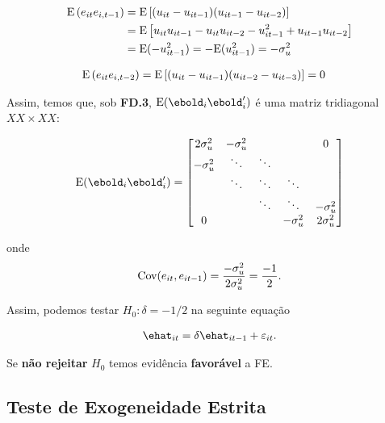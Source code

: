 \documentclass[11pt, oneside, a4paper, article]{article}
\numberwithin{equation}{section}
\begin{document}
\begin{description}
\vspace{-1.5 em}
\begin{align*}
\text{E}\left( e_{it} e_{i,t-1} \right) &=
\text{E}\left[ (u_{it} - u_{it-1}) (u_{it-1} - u_{it-2}) \right]
\\ &=
\text{E}\left[ u_{it}u_{it-1} - u_{it}u_{it-2} - u_{it-1}^{2} + u_{it-1}u_{it-2} \right]
\\ &=
\text{E}(- u_{it-1}^2) = - \text{E}(u_{it-1}^2) = - \sigma_{u}^2
\end{align*}

\vspace{-1.5 em}
\begin{align*}
\text{E}\left( e_{it} e_{i,t-2} \right) &=
\text{E}\left[ (u_{it} - u_{it-1}) (u_{it-2} - u_{it-3}) \right]
= 0
\end{align*}

Assim, temos que, sob \textbf{FD.3},
$\E(\ebold_{i} \ebold_{i}')$
é uma matriz tridiagonal $XX \times XX$:

\vspace{-1 em}
\begin{align*}
\E(\ebold_{i} \ebold_{i}') =
\begin{bmatrix}
2 \sigma_{u}^{2} & - \sigma_{u}^{2} & & & 0
\\
- \sigma_{u}^{2} & \ddots & \ddots
\\
 & \ddots & \ddots & \ddots
\\
& & \ddots & \ddots & - \sigma_{u}^{2}
\\
0 & & & - \sigma_{u}^{2} & 2 \sigma_{u}^{2}
\end{bmatrix}
\end{align*}

\noindent
onde
\begin{align*}
	\text{Cov}(e_{it}, e_{it-1}) = \frac{-\sigma_{u}^{2}}{2 \sigma_{u}^{2}} = \frac{-1}{2}.
\end{align*}

\noindent
Assim, podemos testar $H_{0}: \delta = -1/2$ na seguinte equação

\vspace{-1 em}
\begin{align*}
	\ehat_{it} = \delta \ehat_{it-1} + \err_{it}.
\end{align*}

\noindent
Se \textbf{não rejeitar} $H_{0}$ temos evidência \textbf{favorável} a FE.
\subsection{Teste de Exogeneidade Estrita}


\end{description}
\end{document}
